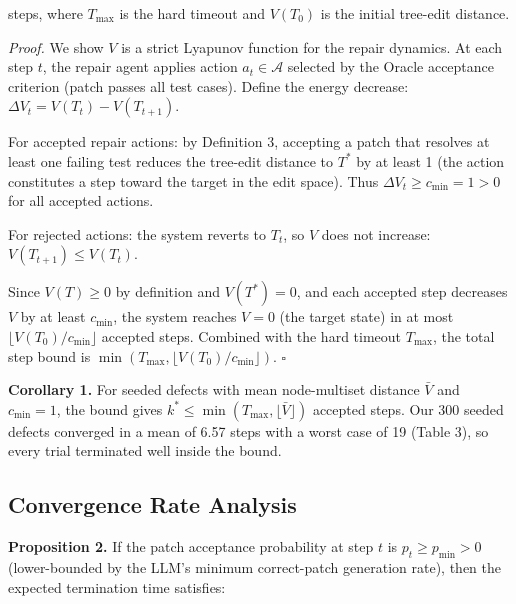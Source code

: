\documentclass[10pt,journal,compsoc,twocolumn]{IEEEtran}
\begin{document}
steps, where $T_{\max}$ is the hard timeout and $V(T_0)$ is the initial tree-edit distance.

\textit{Proof.} We show $V$ is a strict Lyapunov function for the repair dynamics. At each step $t$, the repair agent applies action $a_t \in \mathcal{A}$ selected by the Oracle acceptance criterion (patch passes all test cases). Define the energy decrease: $\Delta V_t = V(T_t) - V(T_{t+1})$.

For accepted repair actions: by Definition 3, accepting a patch that resolves at least one failing test reduces the tree-edit distance to $T^*$ by at least 1 (the action constitutes a step toward the target in the edit space). Thus $\Delta V_t \geq c_{\min} = 1 > 0$ for all accepted actions.

For rejected actions: the system reverts to $T_t$, so $V$ does not increase: $V(T_{t+1}) \leq V(T_t)$.

Since $V(T) \geq 0$ by definition and $V(T^*) = 0$, and each accepted step decreases $V$ by at least $c_{\min}$, the system reaches $V = 0$ (the target state) in at most $\lfloor V(T_0)/c_{\min} \rfloor$ accepted steps. Combined with the hard timeout $T_{\max}$, the total step bound is $\min(T_{\max}, \lfloor V(T_0)/c_{\min} \rfloor)$. $\square$

\textbf{Corollary 1.} For seeded defects with mean node-multiset distance $\bar{V}$ and $c_{\min} = 1$, the bound gives $k^* \leq \min(T_{\max}, \lfloor \bar{V} \rfloor)$ accepted steps. Our 300 seeded defects converged in a mean of 6.57 steps with a worst case of 19 (Table 3), so every trial terminated well inside the bound.


\subsection{Convergence Rate Analysis}


\textbf{Proposition 2.} If the patch acceptance probability at step $t$ is $p_t \geq p_{\min} > 0$ (lower-bounded by the LLM's minimum correct-patch generation rate), then the expected termination time satisfies:
\end{document}
